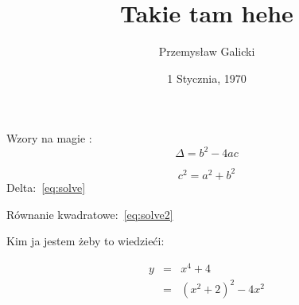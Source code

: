 \documentclass[11pt]{article}
\title{Takie tam hehe }
\author{Przemysław Galicki}
\date{1 Stycznia, 1970}
\begin{document}
\maketitle

\begin{center}Wzory na magie :
\begin{equation} \label{eq:solve}
\Delta = b^{2}-4ac
\end{equation}

\begin{equation} \label{eq:solve2}
c^{2} = a^{2}+b^{2}
\end{equation}
Delta:~\ref{eq:solve}

Równanie kwadratowe:~\ref{eq:solve2}

\centerline{Kim ja jestem żeby to wiedzieći:}
\begin{eqnarray*}
 y &=& x^4 + 4      \nonumber \\
   &=& (x^2+2)^2 -4x^2 \nonumber \\
\end{eqnarray*}


\end{center}
\end{document}
